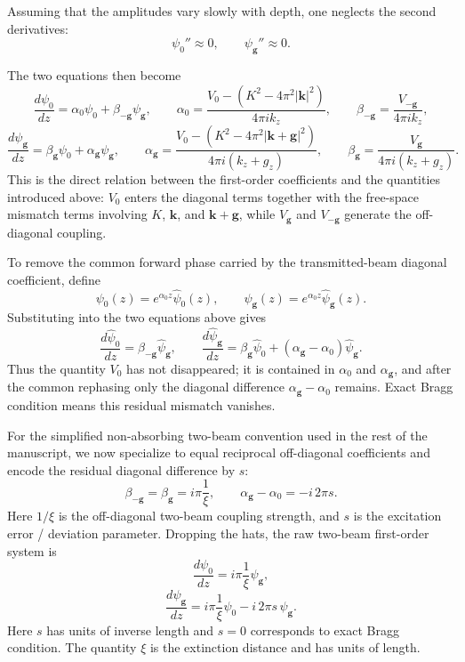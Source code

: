\documentclass[11pt]{article}
\begin{document}
Assuming that the amplitudes vary slowly with depth, one neglects the second derivatives:
\[
\psi_0'' \approx 0,
\qquad
\psi_{\mathbf g}'' \approx 0.
\]

The two equations then become
\[
\frac{d\psi_0}{dz}
=
\alpha_0 \psi_0 + \beta_{-\mathbf g}\psi_{\mathbf g},
\qquad
\alpha_0=
\frac{
V_0-\left(K^2-4\pi^2|\mathbf k|^2\right)
}{
4\pi i k_z
},
\qquad
\beta_{-\mathbf g}=
\frac{V_{-\mathbf g}}{4\pi i k_z},
\]
\[
\frac{d\psi_{\mathbf g}}{dz}
=
\beta_{\mathbf g}\psi_0 + \alpha_{\mathbf g}\psi_{\mathbf g},
\qquad
\alpha_{\mathbf g}=
\frac{
V_0-\left(K^2-4\pi^2|\mathbf k+\mathbf g|^2\right)
}{
4\pi i (k_z+g_z)
},
\qquad
\beta_{\mathbf g}=
\frac{V_{\mathbf g}}{4\pi i (k_z+g_z)}.
\]
This is the direct relation between the first-order coefficients and the quantities introduced above: \(V_0\) enters the diagonal terms together with the free-space mismatch terms involving \(K\), \(\mathbf k\), and \(\mathbf k+\mathbf g\), while \(V_{\mathbf g}\) and \(V_{-\mathbf g}\) generate the off-diagonal coupling.

To remove the common forward phase carried by the transmitted-beam diagonal coefficient, define
\[
\psi_0(z)=e^{\alpha_0 z}\widehat{\psi}_0(z),
\qquad
\psi_{\mathbf g}(z)=e^{\alpha_0 z}\widehat{\psi}_{\mathbf g}(z).
\]
Substituting into the two equations above gives
\[
\frac{d\widehat{\psi}_0}{dz}
=
\beta_{-\mathbf g}\widehat{\psi}_{\mathbf g},
\qquad
\frac{d\widehat{\psi}_{\mathbf g}}{dz}
=
\beta_{\mathbf g}\widehat{\psi}_0
+
\left(\alpha_{\mathbf g}-\alpha_0\right)\widehat{\psi}_{\mathbf g}.
\]
Thus the quantity \(V_0\) has not disappeared; it is contained in \(\alpha_0\) and \(\alpha_{\mathbf g}\), and after the common rephasing only the diagonal difference \(\alpha_{\mathbf g}-\alpha_0\) remains. Exact Bragg condition means this residual mismatch vanishes.

For the simplified non-absorbing two-beam convention used in the rest of the manuscript, we now specialize to equal reciprocal off-diagonal coefficients and encode the residual diagonal difference by \(s\):
\[
\beta_{-\mathbf g}=\beta_{\mathbf g}= i\pi \frac{1}{\xi},
\qquad
\alpha_{\mathbf g}-\alpha_0=-i\,2\pi s.
\]
Here \(1/\xi\) is the off-diagonal two-beam coupling strength, and \(s\) is the excitation error / deviation parameter. Dropping the hats, the raw two-beam first-order system is
\begin{equation}\label{eq:rawpsi0}
\frac{d \psi_0}{dz}= i\pi \frac{1}{\xi}\psi_{\mathbf g},
\end{equation}
\begin{equation}\label{eq:rawpsig}
\frac{d \psi_{\mathbf g}}{dz}= i\pi \frac{1}{\xi}\psi_0 - i\,2\pi s\,\psi_{\mathbf g}.
\end{equation}
Here \(s\) has units of inverse length and \(s=0\) corresponds to exact Bragg condition. The quantity \(\xi\) is the extinction distance and has units of length.
\end{document}
